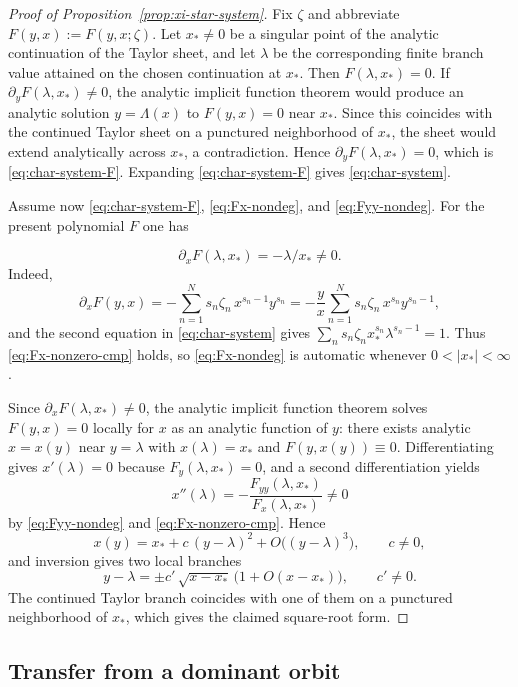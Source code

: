 \documentclass[11pt]{amsart}
\numberwithin{equation}{section}
\theoremstyle{plain}
\theoremstyle{definition}
\theoremstyle{remark}
\begin{document}
\begin{proof}[Proof of Proposition~\ref{prop:xi-star-system}]
Fix $\zeta$ and abbreviate $F(y,x):=F(y,x;\zeta)$. Let $x_*\neq0$ be a singular point of the analytic continuation of the Taylor sheet, and let $\lambda$ be the corresponding finite branch value attained on the chosen continuation at $x_*$. Then $F(\lambda,x_*)=0$. If $\partial_yF(\lambda,x_*)\neq0$, the analytic implicit function theorem would produce an analytic solution $y=\Lambda(x)$ to $F(y,x)=0$ near $x_*$. Since this coincides with the continued Taylor sheet on a punctured neighborhood of $x_*$, the sheet would extend analytically across $x_*$, a contradiction. Hence $\partial_yF(\lambda,x_*)=0$, which is \eqref{eq:char-system-F}. Expanding \eqref{eq:char-system-F} gives \eqref{eq:char-system}.


	Assume now \eqref{eq:char-system-F}, \eqref{eq:Fx-nondeg}, and \eqref{eq:Fyy-nondeg}. For the present polynomial $F$ one has

	\begin{equation}\label{eq:Fx-nonzero-cmp}
		\partial_xF(\lambda,x_*)=-\lambda/x_*\neq0.
	\end{equation}
	Indeed,
	\[
		\partial_xF(y,x)=-\sum_{n=1}^N s_n\zeta_n\,x^{s_n-1}y^{s_n}
		=-\frac{y}{x}\sum_{n=1}^N s_n\zeta_n\,x^{s_n}y^{s_n-1},
	\]
	and the second equation in \eqref{eq:char-system} gives $\sum_n s_n\zeta_n x_*^{s_n}\lambda^{s_n-1}=1$. Thus \eqref{eq:Fx-nonzero-cmp} holds, so \eqref{eq:Fx-nondeg} is automatic whenever $0<|x_*|<\infty$.

	Since $\partial_xF(\lambda,x_*)\neq0$, the analytic implicit function theorem solves $F(y,x)=0$ locally for $x$ as an analytic function of $y$: there exists analytic $x=x(y)$ near $y=\lambda$ with $x(\lambda)=x_*$ and $F(y,x(y))\equiv0$. Differentiating gives $x'(\lambda)=0$ because $F_y(\lambda,x_*)=0$, and a second differentiation yields
	\[
		x''(\lambda)=-\frac{F_{yy}(\lambda,x_*)}{F_x(\lambda,x_*)}\neq0
	\]
	by \eqref{eq:Fyy-nondeg} and \eqref{eq:Fx-nonzero-cmp}. Hence
	\[
		x(y)=x_* + c\,(y-\lambda)^2+O\bigl((y-\lambda)^3\bigr),\qquad c\neq0,
	\]
	and inversion gives two local branches
	\[
		y-\lambda=\pm c'\,\sqrt{x-x_*}\,\bigl(1+O(x-x_*)\bigr),\qquad c'\neq0.
	\]
	The continued Taylor branch coincides with one of them on a punctured neighborhood of $x_*$, which gives the claimed square-root form.
\end{proof}

\subsection{Transfer from a dominant orbit}
\label{app:transfer-dominant}
\end{document}

